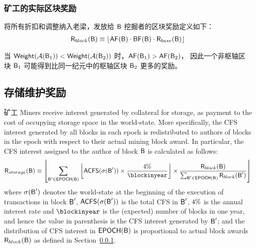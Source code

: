 \subsubsection{矿工的实际区块奖励}
\label{subsubsec:actualblockaward}
将所有折扣和调整纳入老梁，发放给 $\textsf{B}$ 挖掘者的区块奖励定义如下：
	\begin{align}
		\textsf{R}_{block}(\textsf{B}) \equiv \left\lfloor\mathsf{AF}(\textsf{B})\cdot \mathsf{BF}(\textsf{B})
		\cdot \textsf{R}_{base}(\textsf{B})\right\rfloor
	\end{align}


当 $\mathsf{Weight}(\mathcal{A}(\textsf{B}_1))<\mathsf{Weight}(\mathcal{A}(\textsf{B}_2))$ 时，$\mathsf{AF}(\textsf{B}_1)>\mathsf{AF}(\textsf{B}_2)$， 因此一个非枢轴区块 $\textsf{B}_1$ 可能得到比同一纪元中的枢轴区块 $\textsf{B}_2$ 更多的奖励。	


\subsection{存储维护奖励}
	\label{subsec:storagefee}

矿工
	Miners receive interest generated by collateral for storage, as payment to the cost of occupying storage space in the world-state.
	More specifically, the CFS interest generated by all blocks in each epoch is redistributed to authors of blocks in the epoch with respect to their actual mining block award.
	In particular, the CFS interest assigned to the author of block $\textsf{B}$ is calculated as follows:
	\begin{align}
		\storageaward(\block) \eqdef 
		\left\lfloor \sum_{\block'\in\epf(\block)} \left\lfloor \mathsf{ACFS}(\st(\block'))
		\times \frac{\interest}{\blockinyear}\right\rfloor
		\times \frac{\award(\block)}{\sum_{\block'\in\epf(\block)} \award(\block') } \right\rfloor
	\end{align}
	where $\mathbf{\sigma}(\textsf{B}')$ denotes the world-state at the beginning of the execution of transactions in block $\textsf{B}'$,
	$\mathsf{ACFS}(\mathbf{\sigma}(\textsf{B}'))$ is the total CFS in $\textsf{B}'$, 
	${4\%}$ is the annual interest rate and $\blockinyear$ is the (expected) number of blocks in one year,
	and hence the value in parenthesis is the CFS interest generated by $\textsf{B}'$;
	and the distribution of CFS interest in $\mathsf{EPOCH} (\textsf{B})$ is proportional to actual block awards $\textsf{R}_{block}(\textsf{B})$ as defined in Section~\ref{subsubsec:actualblockaward}. 

